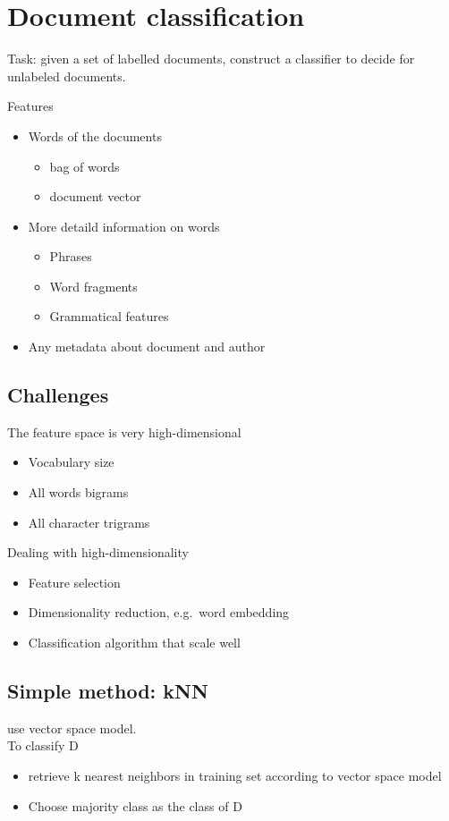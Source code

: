 \section{Document classification}
Task: given a set of labelled documents, construct a classifier to
decide for unlabeled documents.

Features
\begin{itemize}
\item Words of the documents
  \begin{itemize}
  \item bag of words
  \item document vector
  \end{itemize}
\item More detaild information on words
  \begin{itemize}
  \item Phrases
  \item Word fragments
  \item Grammatical features
  \end{itemize}
\item Any metadata about document and author
\end{itemize}

\subsection{Challenges}
The feature space is very high-dimensional
\begin{itemize}
\item Vocabulary size
\item All words bigrams
\item All character trigrams
\end{itemize}

Dealing with high-dimensionality
\begin{itemize}
\item Feature selection
\item Dimensionality reduction, e.g.\ word embedding
\item Classification algorithm that scale well
\end{itemize}

\subsection{Simple method: kNN}
use vector space model. \\
To classify D
\begin{itemize}
\item retrieve k nearest neighbors in training set according to vector
  space model
\item Choose majority class as the class of D
\end{itemize}

